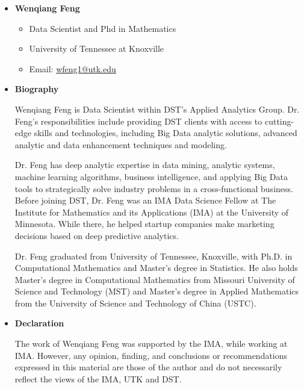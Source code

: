 \documentclass[letterpaper,11pt,english]{sphinxmanual}
\begin{document}
\label{preface:about-the-authors}\begin{itemize}
\item {} 
\textbf{Wenqiang Feng}
\begin{itemize}
\item {} 
Data Scientist and Phd in Mathematics

\item {} 
University of Tennessee at Knoxville

\item {} 
Email: \href{mailto:wfeng1@utk.edu}{wfeng1@utk.edu}

\end{itemize}

\item {} 
\textbf{Biography}

Wenqiang Feng is Data Scientist within DST’s Applied Analytics Group. Dr. Feng’s responsibilities include providing DST clients with access to cutting-edge skills and technologies, including Big Data analytic solutions, advanced analytic and data enhancement techniques and modeling.

Dr. Feng has deep analytic expertise in data mining, analytic systems, machine learning algorithms, business intelligence, and applying Big Data tools to strategically solve industry problems in a cross-functional business. Before joining DST, Dr. Feng was an IMA Data Science Fellow at The Institute for Mathematics and its Applications (IMA) at the University of Minnesota. While there, he helped startup companies make marketing decisions based on deep predictive analytics.

Dr. Feng graduated from University of Tennessee, Knoxville, with Ph.D. in Computational Mathematics and Master’s degree in Statistics. He also holds Master’s degree in Computational Mathematics from Missouri University of Science and Technology (MST) and Master’s degree in Applied Mathematics from the University of Science and Technology of China (USTC).

\item {} 
\textbf{Declaration}

The work of Wenqiang Feng was supported by the IMA, while working at IMA. However, any opinion, finding, and conclusions or recommendations expressed in this material are those of the author and do not necessarily reflect the views of the IMA, UTK and DST.

\end{itemize}
\end{document}
